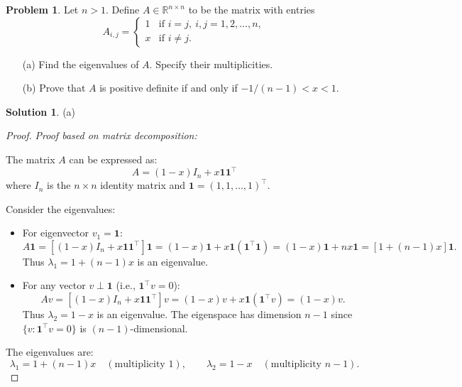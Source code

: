 \documentclass[12pt]{article}
\theoremstyle{definition}
\newtheorem*{solution}{\normalfont\textbf{Solution}}
\newtheorem*{Problem}{\noindent\textbf{Problem}}
\begin{document}
\begin{enumerate}[leftmargin=*]
    \item \begin{Problem}
            Let \( n > 1 \). Define \( A \in \mathbb{R}^{n \times n} \) to be the matrix with entries
            \[
            A_{i,j} = 
            \begin{cases} 
            1 & \text{if } i = j, \ i,j = 1,2,\ldots,n, \\
            x & \text{if } i \neq j.
            \end{cases}
            \]
            \begin{enumerate}
                \item[(a)] Find the eigenvalues of \( A \). Specify their multiplicities.
                \item[(b)] Prove that \( A \) is positive definite if and only if \( -1/(n - 1) < x < 1 \).
            \end{enumerate}
        \end{Problem}
        \begin{solution}
            \item[(a)] 
                \begin{proof}
                    \textit{Proof based on matrix decomposition:}
                    
                    The matrix \( A \) can be expressed as:
                    \[
                    A = (1 - x)I_n + x \mathbf{1}\mathbf{1}^\top
                    \]
                    where \( I_n \) is the \( n \times n \) identity matrix and \( \mathbf{1} = (1, 1, \dots, 1)^\top \).

                    Consider the eigenvalues:
                    \begin{itemize}
                    \item For eigenvector \( v_1 = \mathbf{1} \):
                    \[
                    A\mathbf{1} = [(1 - x)I_n + x \mathbf{1}\mathbf{1}^\top] \mathbf{1} = (1 - x)\mathbf{1} + x \mathbf{1}(\mathbf{1}^\top\mathbf{1}) = (1 - x)\mathbf{1} + nx\mathbf{1} = [1 + (n-1)x]\mathbf{1}.
                    \]
                    Thus \( \lambda_1 = 1 + (n-1)x \) is an eigenvalue.

                    \item For any vector \( v \perp \mathbf{1} \) (i.e., \( \mathbf{1}^\top v = 0 \)):
                    \[
                    Av = [(1 - x)I_n + x \mathbf{1}\mathbf{1}^\top] v = (1 - x)v + x \mathbf{1}(\mathbf{1}^\top v) = (1 - x)v.
                    \]
                    Thus \( \lambda_2 = 1 - x \) is an eigenvalue. The eigenspace has dimension \( n-1 \) since \( \{v : \mathbf{1}^\top v = 0\} \) is \( (n-1) \)-dimensional.
                    \end{itemize}
                    The eigenvalues are:
                    \[
                    \lambda_1 = 1 + (n-1)x \quad (\text{multiplicity } 1), \qquad \lambda_2 = 1 - x \quad (\text{multiplicity } n-1).
                    \]
                    

\end{proof}
\end{solution}
\end{enumerate}
\end{document}
